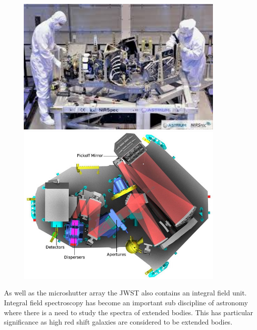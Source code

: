 			\begin{figure}[!htbp]
				\begin{minipage}[c]{0.5\linewidth}
					\centering
					\includegraphics[width=0.9\textwidth]{../Images/nirspec_construction.jpeg}
					\caption{\label{fig:nirspec_construction}}
				\end{minipage}
				\begin{minipage}[c]{0.5\linewidth}
					\centering
					\includegraphics[width=0.9\textwidth]{../Images/nirspec_mirrors.jpeg}
					\caption{\label{fig:nirspec_mirrors}}
				\end{minipage}
			\end{figure}

			As well as the microshutter array the JWST also contains an integral field unit. Integral field spectroscopy has become an important sub discipline of astronomy where there is a need to study the spectra of extended bodies. This has particular significance as high red shift galaxies are considered to be extended bodies.

